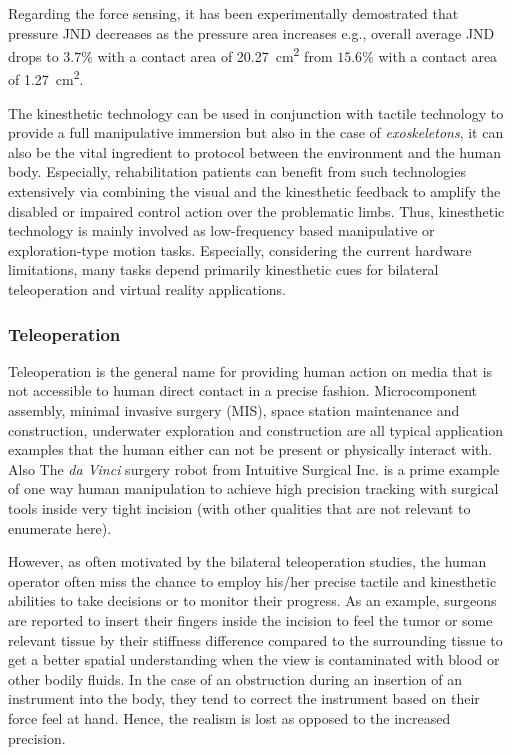 Regarding the force sensing, it has been experimentally demostrated that pressure JND decreases as the pressure area increases e.g., overall average JND drops to $3.7\%$ with a contact area of \SI{20.27}{\centi\meter\squared} from $15.6\%$ with a contact area of \SI{1.27}{\centi\meter\squared}. 

The kinesthetic technology can be used in conjunction with tactile technology to provide a full manipulative immersion but also in the case of \emph{exoskeletons}, it can also be the vital ingredient to protocol between the environment and the human body. Especially, rehabilitation patients can benefit from such technologies extensively via combining the visual and the kinesthetic feedback to amplify the disabled or impaired control action over the problematic limbs. Thus, kinesthetic technology is mainly involved as low-frequency based manipulative or exploration-type motion tasks. Especially, considering the current hardware limitations, many tasks depend primarily kinesthetic cues for bilateral teleoperation and virtual reality applications.


\subsubsection{Teleoperation}
Teleoperation is the general name for providing human action on media that is not accessible to human direct contact in a precise fashion. Microcomponent assembly, minimal invasive surgery (MIS), space station maintenance and construction, underwater exploration and construction are all typical application examples that the human either can not be present or physically interact with. Also The \emph{da Vinci}\raisebox{0.5ex}{\scriptsize\texttrademark} surgery robot from Intuitive Surgical Inc. is a prime example of one way human manipulation to achieve high precision tracking with surgical tools inside very tight incision (with other qualities that are not relevant to enumerate here). 

However, as often motivated by the bilateral teleoperation studies, the human operator often miss the chance to employ his/her precise tactile and kinesthetic abilities to take decisions or to monitor their progress. As an example, surgeons are reported to insert their fingers inside the incision to feel the tumor or some relevant tissue by their stiffness difference compared to the surrounding tissue to get a better spatial understanding when the view is contaminated with blood or other bodily fluids. In the case of an obstruction during an insertion of an instrument into the body, they tend to correct the instrument based on their force feel at hand. Hence, the realism is lost as opposed to the increased precision. 

